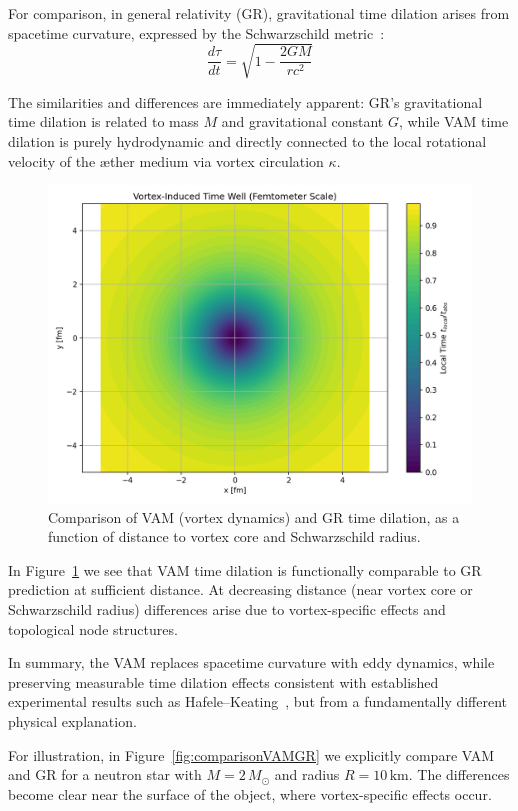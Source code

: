 For comparison, in general relativity (GR), gravitational time dilation arises from spacetime curvature, expressed by the Schwarzschild metric~\cite{schutz2009first}:
\begin{equation}\label{eq:GRtime}
\frac{d\tau}{dt} = \sqrt{1 - \frac{2GM}{rc^2}}
\end{equation}

The similarities and differences are immediately apparent: GR's gravitational time dilation is related to mass $M$ and gravitational constant $G$, while VAM time dilation is purely hydrodynamic and directly connected to the local rotational velocity of the æther medium via vortex circulation $\kappa$.

\begin{figure}[ht!]
    \centering
    \includegraphics[width=0.7\linewidth]{02-RadialProfileOfLocalTimeDilation_Vortex-Induced_Time_Well}
    \caption{Comparison of VAM (vortex dynamics) and GR time dilation, as a function of distance to vortex core and Schwarzschild radius.}
    \label{fig:vergelijking_VAMGR}
\end{figure}

In Figure~\ref{fig:vergelijking_VAMGR} we see that VAM time dilation is functionally comparable to GR prediction at sufficient distance. At decreasing distance (near vortex core or Schwarzschild radius) differences arise due to vortex-specific effects and topological node structures.

In summary, the VAM replaces spacetime curvature with eddy dynamics, while preserving measurable time dilation effects consistent with established experimental results such as Hafele–Keating~\cite{hafele1972around}, but from a fundamentally different physical explanation.

For illustration, in Figure~\ref{fig:comparisonVAMGR} we explicitly compare VAM and GR for a neutron star with $M = 2\,M_\odot$ and radius $R = 10\,\text{km}$. The differences become clear near the surface of the object, where vortex-specific effects occur.

